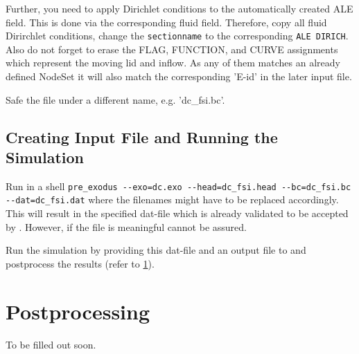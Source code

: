 Further, you need to apply Dirichlet conditions to the automatically created ALE field. This is done via the corresponding fluid field. Therefore, copy all fluid Dirirchlet conditions, change the \verb|sectionname| to the corresponding \verb|ALE DIRICH|. Also do not forget to erase the FLAG, FUNCTION, and CURVE assignments which represent the moving lid and inflow. As any of them matches an already defined NodeSet it will also match the corresponding 'E-id' in the later \baci{} input file.

Safe the file under a different name, e.g. 'dc\_fsi.bc'.

\subsection{Creating \baci{} Input File and Running the Simulation}
Run in a shell \verb|pre_exodus --exo=dc.exo --head=dc_fsi.head --bc=dc_fsi.bc --dat=dc_fsi.dat| where the filenames might have to be replaced accordingly. This will result in the specified dat-file which is already validated to be accepted by \baci{}. However, if the file is meaningful cannot be assured.

Run the simulation by providing this dat-file and an output file to \baci{} and postprocess the results (refer to \ref{tut_fsi_preexo:postprocess}).

\section{Postprocessing}
\label{tut_fsi_preexo:postprocess}
To be filled out soon.
